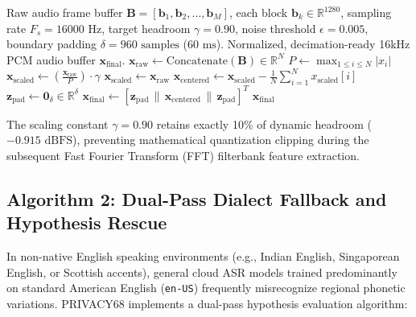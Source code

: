 \begin{algorithm}[htbp]
\caption{Push-to-Talk Dynamic Peak Normalization and Boundary Conditioning}
\label{alg:peak_norm}
\begin{algorithmic}[1]
\Require Raw audio frame buffer $\mathbf{B} = [\mathbf{b}_1, \mathbf{b}_2, \dots, \mathbf{b}_M]$, each block $\mathbf{b}_k \in \mathbb{R}^{1280}$, sampling rate $F_s = 16000\text{ Hz}$, target headroom $\gamma = 0.90$, noise threshold $\epsilon = 0.005$, boundary padding $\delta = 960\text{ samples}$ ($60\text{ ms}$).
\Ensure Normalized, decimation-ready 16kHz PCM audio buffer $\mathbf{x}_{\text{final}}$.
\State $\mathbf{x}_{\text{raw}} \gets \text{Concatenate}(\mathbf{B}) \in \mathbb{R}^N$ 
\State $P \gets \max_{1 \le i \le N} |x_i|$ 
    \State $\mathbf{x}_{\text{scaled}} \gets \left( \frac{\mathbf{x}_{\text{raw}}}{P} \right) \cdot \gamma$ 
\Else
    \State $\mathbf{x}_{\text{scaled}} \gets \mathbf{x}_{\text{raw}}$ 
\EndIf
\State $\mathbf{x}_{\text{centered}} \gets \mathbf{x}_{\text{scaled}} - \frac{1}{N}\sum_{i=1}^N x_{\text{scaled}}[i]$ 
\State $\mathbf{z}_{\text{pad}} \gets \mathbf{0}_{\delta} \in \mathbb{R}^{\delta}$ 
\State $\mathbf{x}_{\text{final}} \gets [\mathbf{z}_{\text{pad}} \,\|\, \mathbf{x}_{\text{centered}} \,\|\, \mathbf{z}_{\text{pad}}]^T$ 
\State \Return $\mathbf{x}_{\text{final}}$
\end{algorithmic}
\end{algorithm}

The scaling constant $\gamma = 0.90$ retains exactly 10\% of dynamic headroom ($ -0.915\text{ dBFS}$), preventing mathematical quantization clipping during the subsequent Fast Fourier Transform (FFT) filterbank feature extraction.

\subsection{Algorithm 2: Dual-Pass Dialect Fallback and Hypothesis Rescue}
In non-native English speaking environments (e.g., Indian English, Singaporean English, or Scottish accents), general cloud ASR models trained predominantly on standard American English (\texttt{en-US}) frequently misrecognize regional phonetic variations. PRIVACY68 implements a dual-pass hypothesis evaluation algorithm:

